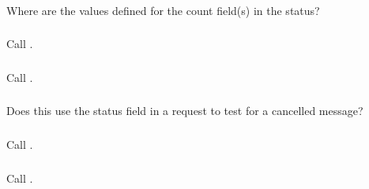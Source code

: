 \documentclass{article}
\begin{document}
\subsubsection{}
Where are the values defined for the count field(s) in the status?

\subsubsection{}
Call .

\subsubsection{}

\subsubsection{}

\subsubsection{}
Call .

\subsubsection{}
Does this use the status field in a request to test for a cancelled message?

\subsubsection{}
Call .

\subsubsection{}

\subsubsection{}

\subsubsection{}
Call .
\end{document}
